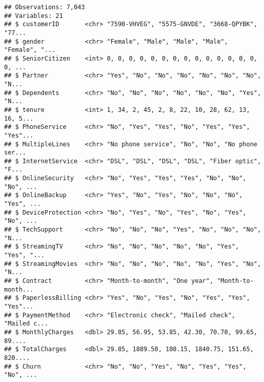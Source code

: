 \documentclass[]{article}
\newenvironment{Shaded}{\begin{snugshade}}{\end{snugshade}}
\newcommand{\KeywordTok}[1]{\textcolor[rgb]{0.13,0.29,0.53}{\textbf{#1}}}
\newcommand{\StringTok}[1]{\textcolor[rgb]{0.31,0.60,0.02}{#1}}
\newcommand{\CommentTok}[1]{\textcolor[rgb]{0.56,0.35,0.01}{\textit{#1}}}
\newcommand{\OperatorTok}[1]{\textcolor[rgb]{0.81,0.36,0.00}{\textbf{#1}}}
\newcommand{\NormalTok}[1]{#1}
\begin{document}
\begin{verbatim}
## Observations: 7,043
## Variables: 21
## $ customerID       <chr> "7590-VHVEG", "5575-GNVDE", "3668-QPYBK", "77...
## $ gender           <chr> "Female", "Male", "Male", "Male", "Female", "...
## $ SeniorCitizen    <int> 0, 0, 0, 0, 0, 0, 0, 0, 0, 0, 0, 0, 0, 0, 0, ...
## $ Partner          <chr> "Yes", "No", "No", "No", "No", "No", "No", "N...
## $ Dependents       <chr> "No", "No", "No", "No", "No", "No", "Yes", "N...
## $ tenure           <int> 1, 34, 2, 45, 2, 8, 22, 10, 28, 62, 13, 16, 5...
## $ PhoneService     <chr> "No", "Yes", "Yes", "No", "Yes", "Yes", "Yes"...
## $ MultipleLines    <chr> "No phone service", "No", "No", "No phone ser...
## $ InternetService  <chr> "DSL", "DSL", "DSL", "DSL", "Fiber optic", "F...
## $ OnlineSecurity   <chr> "No", "Yes", "Yes", "Yes", "No", "No", "No", ...
## $ OnlineBackup     <chr> "Yes", "No", "Yes", "No", "No", "No", "Yes", ...
## $ DeviceProtection <chr> "No", "Yes", "No", "Yes", "No", "Yes", "No", ...
## $ TechSupport      <chr> "No", "No", "No", "Yes", "No", "No", "No", "N...
## $ StreamingTV      <chr> "No", "No", "No", "No", "No", "Yes", "Yes", "...
## $ StreamingMovies  <chr> "No", "No", "No", "No", "No", "Yes", "No", "N...
## $ Contract         <chr> "Month-to-month", "One year", "Month-to-month...
## $ PaperlessBilling <chr> "Yes", "No", "Yes", "No", "Yes", "Yes", "Yes"...
## $ PaymentMethod    <chr> "Electronic check", "Mailed check", "Mailed c...
## $ MonthlyCharges   <dbl> 29.85, 56.95, 53.85, 42.30, 70.70, 99.65, 89....
## $ TotalCharges     <dbl> 29.85, 1889.50, 108.15, 1840.75, 151.65, 820....
## $ Churn            <chr> "No", "No", "Yes", "No", "Yes", "Yes", "No", ...
\end{verbatim}

\begin{Shaded}
\end{Shaded}
\end{document}
